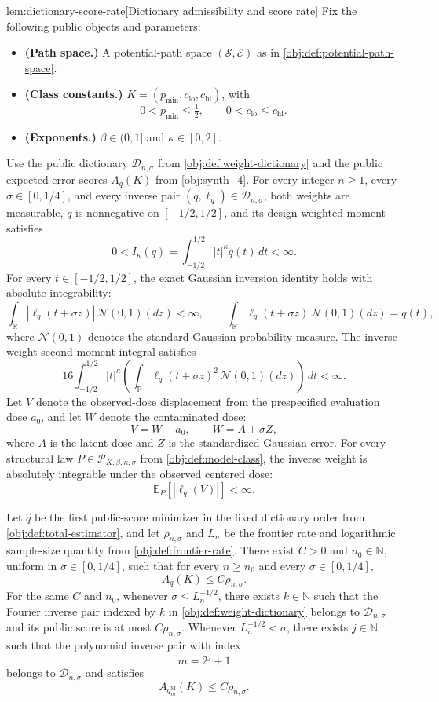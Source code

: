 \begin{lemmav}{lem:dictionary-score-rate}[Dictionary admissibility and score rate]
Fix the following public objects and parameters:
\begin{itemize}
\item \textbf{(Path space.)} A potential-path space \((\mathcal S,\mathcal E)\) as in \cref{obj:def:potential-path-space}.
\item \textbf{(Class constants.)} \(K=(p_{\min},c_{\mathrm{lo}},c_{\mathrm{hi}})\), with
\[
0<p_{\min}\le \tfrac12,
\qquad
0<c_{\mathrm{lo}}\le c_{\mathrm{hi}}.
\]
\item \textbf{(Exponents.)} \(\beta\in(0,1]\) and \(\kappa\in[0,2]\).
\end{itemize}
Use the public dictionary \(\mathcal D_{n,\sigma}\) from \cref{obj:def:weight-dictionary} and the public expected-error scores \(A_q(K)\) from \cref{obj:synth_4}. For every integer \(n\ge1\), every \(\sigma\in[0,1/4]\), and every inverse pair \((q,\ell_q)\in\mathcal D_{n,\sigma}\), both weights are measurable, \(q\) is nonnegative on \([-1/2,1/2]\), and its design-weighted moment satisfies
\[
0<I_\kappa(q)
=
\int_{-1/2}^{1/2}|t|^\kappa q(t)\,dt
<\infty.
\]
For every \(t\in[-1/2,1/2]\), the exact Gaussian inversion identity holds with absolute integrability:
\[
\int_{\mathbb R}|\ell_q(t+\sigma z)|\,\mathcal N(0,1)(dz)<\infty,
\qquad
\int_{\mathbb R}\ell_q(t+\sigma z)\,\mathcal N(0,1)(dz)=q(t),
\]
where \(\mathcal N(0,1)\) denotes the standard Gaussian probability measure. The inverse-weight second-moment integral satisfies
\[
16\int_{-1/2}^{1/2}|t|^\kappa
\left(\int_{\mathbb R}\ell_q(t+\sigma z)^2\,\mathcal N(0,1)(dz)\right)\,dt
<\infty.
\]
Let \(V\) denote the observed-dose displacement from the prespecified evaluation dose \(a_0\), and let \(W\) denote the contaminated dose:
\[
V=W-a_0,
\qquad
W=A+\sigma Z,
\]
where \(A\) is the latent dose and \(Z\) is the standardized Gaussian error. For every structural law \(P\in\mathcal P_{K,\beta,\kappa,\sigma}\) from \cref{obj:def:model-class}, the inverse weight is absolutely integrable under the observed centered dose:
\[
\mathbb E_P[|\ell_q(V)|]<\infty.
\]

Let \(\widehat q\) be the first public-score minimizer in the fixed dictionary order from \cref{obj:def:total-estimator}, and let \(\rho_{n,\sigma}\) and \(L_n\) be the frontier rate and logarithmic sample-size quantity from \cref{obj:def:frontier-rate}. There exist \(C>0\) and \(n_0\in\mathbb N\), uniform in \(\sigma\in[0,1/4]\), such that for every \(n\ge n_0\) and every \(\sigma\in[0,1/4]\),
\[
A_{\widehat q}(K)\le C\rho_{n,\sigma}.
\]
For the same \(C\) and \(n_0\), whenever \(\sigma\le L_n^{-1/2}\), there exists \(k\in\mathbb N\) such that the Fourier inverse pair indexed by \(k\) in \cref{obj:def:weight-dictionary} belongs to \(\mathcal D_{n,\sigma}\) and its public score is at most \(C\rho_{n,\sigma}\). Whenever \(L_n^{-1/2}<\sigma\), there exists \(j\in\mathbb N\) such that the polynomial inverse pair with index
\[
m=2^j+1
\]
belongs to \(\mathcal D_{n,\sigma}\) and satisfies
\[
A_{q_m^{\mathrm M}}(K)\le C\rho_{n,\sigma}.
\]
\end{lemmav}

